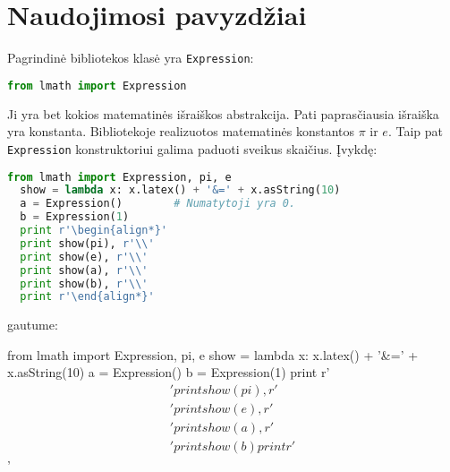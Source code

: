 \chapter{Naudojimosi pavyzdžiai}

Pagrindinė bibliotekos klasė yra \verb|Expression|: 
\begin{lstlisting}[language=python]
  from lmath import Expression
\end{lstlisting}
Ji yra bet kokios matematinės išraiškos abstrakcija. Pati paprasčiausia
išraiška yra konstanta. Bibliotekoje realizuotos matematinės konstantos
$\pi$ ir $e$. Taip pat \verb|Expression| konstruktoriui galima paduoti
sveikus skaičius. Įvykdę:
\begin{lstlisting}[language=python]
  from lmath import Expression, pi, e
  show = lambda x: x.latex() + '&=' + x.asString(10)
  a = Expression()        # Numatytoji yra 0.
  b = Expression(1)
  print r'\begin{align*}'
  print show(pi), r'\\'
  print show(e), r'\\'
  print show(a), r'\\'
  print show(b), r'\\'
  print r'\end{align*}'
\end{lstlisting}
gautume:

\begin{python}%
from lmath import Expression, pi, e
show = lambda x: x.latex() + '&=' + x.asString(10)
a = Expression()
b = Expression(1)
print r'\begin{align*}'
print show(pi), r'\\'
print show(e), r'\\'
print show(a), r'\\'
print show(b)
print r'\end{align*}'
\end{python}

